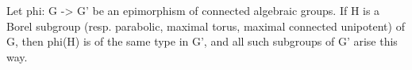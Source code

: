 Let phi: G -> G' be an epimorphism of connected algebraic groups. If H is a Borel subgroup (resp. parabolic, maximal torus, maximal connected unipotent) of G, then phi(H) is of the same type in G', and all such subgroups of G' arise this way.
